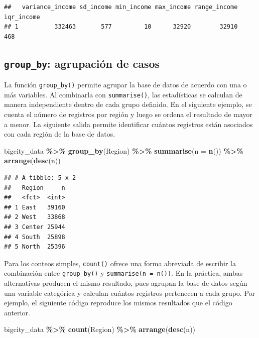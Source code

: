 \documentclass[
  spanish,
  12pt,
]{book}
\newenvironment{Shaded}{\begin{snugshade}}{\end{snugshade}}
\newcommand{\AttributeTok}[1]{\textcolor[rgb]{0.13,0.29,0.53}{#1}}
\newcommand{\FunctionTok}[1]{\textcolor[rgb]{0.13,0.29,0.53}{\textbf{#1}}}
\newcommand{\NormalTok}[1]{#1}
\newcommand{\SpecialCharTok}[1]{\textcolor[rgb]{0.81,0.36,0.00}{\textbf{#1}}}
\begin{document}
\begin{verbatim}
##   variance_income sd_income min_income max_income range_income iqr_income
## 1          332463       577         10      32920        32910        468
\end{verbatim}

\subsection{\texorpdfstring{\texttt{group\_by}: agrupación de casos}{group\_by: agrupación de casos}}\label{group-by-agrupacion-de-casos}

La función \texttt{group\_by()} permite agrupar la base de datos de acuerdo con una o más variables. Al combinarla con \texttt{summarise()}, las estadísticas se calculan de manera independiente dentro de cada grupo definido. En el siguiente ejemplo, se cuenta el número de registros por región y luego se ordena el resultado de mayor a menor. La siguiente salida permite identificar cuántos registros están asociados con cada región de la base de datos.

\begin{Shaded}
\begin{Highlighting}[]
\NormalTok{bigcity\_data }\SpecialCharTok{\%\textgreater{}\%}
  \FunctionTok{group\_by}\NormalTok{(Region) }\SpecialCharTok{\%\textgreater{}\%}
  \FunctionTok{summarise}\NormalTok{(}\AttributeTok{n =} \FunctionTok{n}\NormalTok{()) }\SpecialCharTok{\%\textgreater{}\%}
  \FunctionTok{arrange}\NormalTok{(}\FunctionTok{desc}\NormalTok{(n))}
\end{Highlighting}
\end{Shaded}

\begin{verbatim}
## # A tibble: 5 x 2
##   Region     n
##   <fct>  <int>
## 1 East   39160
## 2 West   33868
## 3 Center 25944
## 4 South  25898
## 5 North  25396
\end{verbatim}

Para los conteos simples, \texttt{count()} ofrece una forma abreviada de escribir la combinación entre \texttt{group\_by()} y \texttt{summarise(n\ =\ n())}. En la práctica, ambas alternativas producen el mismo resultado, pues agrupan la base de datos según una variable categórica y calculan cuántos registros pertenecen a cada grupo. Por ejemplo, el siguiente código reproduce los mismos resultados que el código anterior.

\begin{Shaded}
\begin{Highlighting}[]
\NormalTok{bigcity\_data }\SpecialCharTok{\%\textgreater{}\%}
  \FunctionTok{count}\NormalTok{(Region) }\SpecialCharTok{\%\textgreater{}\%}
  \FunctionTok{arrange}\NormalTok{(}\FunctionTok{desc}\NormalTok{(n))}
\end{Highlighting}
\end{Shaded}
\end{document}
